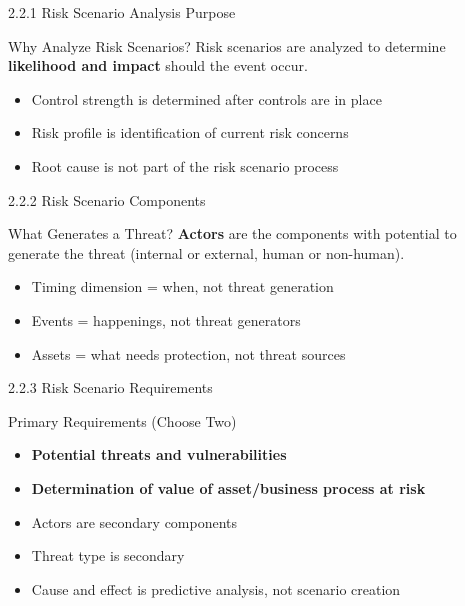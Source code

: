 \documentclass{beamer}
\begin{document}
	\begin{frame}{2.2.1 Risk Scenario Analysis Purpose}
		\begin{block}{Why Analyze Risk Scenarios?}
			Risk scenarios are analyzed to determine \textbf{likelihood and impact} should the event occur.
		\end{block}
		\begin{itemize}
			\item Control strength is determined after controls are in place
			\item Risk profile is identification of current risk concerns
			\item Root cause is not part of the risk scenario process
		\end{itemize}
	\end{frame}
	
	\begin{frame}{2.2.2 Risk Scenario Components}
		\begin{block}{What Generates a Threat?}
			\textbf{Actors} are the components with potential to generate the threat (internal or external, human or non-human).
		\end{block}
		\begin{itemize}
			\item Timing dimension = when, not threat generation
			\item Events = happenings, not threat generators
			\item Assets = what needs protection, not threat sources
		\end{itemize}
	\end{frame}
	
	\begin{frame}{2.2.3 Risk Scenario Requirements}
		\begin{block}{Primary Requirements (Choose Two)}
			\begin{itemize}
				\item \textbf{Potential threats and vulnerabilities}
				\item \textbf{Determination of value of asset/business process at risk}
			\end{itemize}
		\end{block}
		\begin{itemize}
			\item Actors are secondary components
			\item Threat type is secondary
			\item Cause and effect is predictive analysis, not scenario creation
		\end{itemize}
	\end{frame}
	
\end{document}
